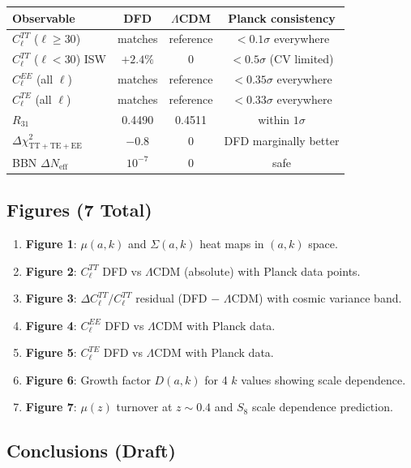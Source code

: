 \documentclass[11pt,a4paper]{article}
\begin{document}
\begin{center}
\begin{longtable}{lccc}
\toprule
\textbf{Observable} & \textbf{DFD} & \textbf{$\Lambda$CDM} & \textbf{Planck consistency} \\
\midrule
$C_\ell^{TT}$ ($\ell \geq 30$) & matches & reference & $< 0.1\sigma$ everywhere \\
$C_\ell^{TT}$ ($\ell < 30$) ISW & $+2.4\%$ & 0 & $< 0.5\sigma$ (CV limited) \\
$C_\ell^{EE}$ (all $\ell$) & matches & reference & $< 0.35\sigma$ everywhere \\
$C_\ell^{TE}$ (all $\ell$) & matches & reference & $< 0.33\sigma$ everywhere \\
$R_{31}$ & 0.4490 & 0.4511 & within $1\sigma$ \\
$\Delta\chi^2_{\mathrm{TT+TE+EE}}$ & $-0.8$ & 0 & DFD marginally better \\
BBN $\Delta N_{\mathrm{eff}}$ & $10^{-7}$ & 0 & safe \\
\bottomrule
\end{longtable}
\end{center}

\subsection{Figures (7 Total)}

\begin{enumerate}
\item \textbf{Figure 1}: $\mu(a,k)$ and $\Sigma(a,k)$ heat maps in $(a, k)$ space.
\item \textbf{Figure 2}: $C_\ell^{TT}$ DFD vs $\Lambda$CDM (absolute) with Planck data points.
\item \textbf{Figure 3}: $\Delta C_\ell^{TT}/C_\ell^{TT}$ residual (DFD $-$ $\Lambda$CDM) with cosmic variance band.
\item \textbf{Figure 4}: $C_\ell^{EE}$ DFD vs $\Lambda$CDM with Planck data.
\item \textbf{Figure 5}: $C_\ell^{TE}$ DFD vs $\Lambda$CDM with Planck data.
\item \textbf{Figure 6}: Growth factor $D(a,k)$ for 4 $k$ values showing scale dependence.
\item \textbf{Figure 7}: $\mu(z)$ turnover at $z \sim 0.4$ and $S_8$ scale dependence prediction.
\end{enumerate}

\subsection{Conclusions (Draft)}
\end{document}
